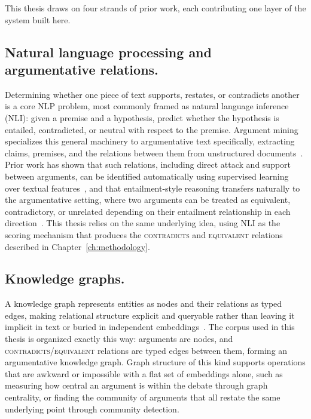 This thesis draws on four strands of prior work, each contributing one layer of the system built
here.

\subsection{Natural language processing and argumentative relations.}
\label{sec:background-nlp}

Determining whether one piece of text supports, restates, or contradicts another is a core NLP
problem, most commonly framed as natural language inference (NLI): given a premise and a
hypothesis, predict whether the hypothesis is entailed, contradicted, or neutral with respect to
the premise. Argument mining specializes this general machinery to argumentative text
specifically, extracting claims, premises, and the relations between them from unstructured
documents~\cite{lippi2016argumentation}. Prior work has shown that such relations, including
direct attack and support between arguments, can be identified automatically using supervised
learning over textual features~\cite{cocarascu2017}, and that entailment-style reasoning
transfers naturally to the argumentative setting, where two arguments can be treated as
equivalent, contradictory, or unrelated depending on their entailment relationship in each
direction~\cite{cabrio2012}. This thesis relies on the same underlying idea, using NLI as the
scoring mechanism that produces the \textsc{contradicts} and \textsc{equivalent} relations
described in Chapter~\ref{ch:methodology}.

\subsection{Knowledge graphs.}
A knowledge graph represents entities as nodes and their relations as typed edges, making
relational structure explicit and queryable rather than leaving it implicit in text or buried in
independent embeddings~\cite{hogan2021knowledgegraphs}. The corpus used in this thesis is
organized exactly this way: arguments are nodes, and \textsc{contradicts}/\textsc{equivalent}
relations are typed edges between them, forming an argumentative knowledge graph. Graph
structure of this kind supports operations that are awkward or impossible with a flat set of
embeddings alone, such as measuring how central an argument is within the debate through
graph centrality, or finding the community of arguments that all restate the same underlying
point through community detection.

